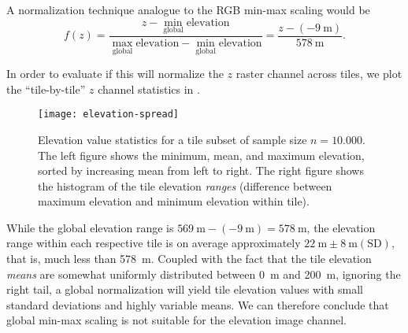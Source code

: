 A normalization technique analogue to the RGB min-max scaling would be
\begin{equation*}
  f(z)
  =
  \frac{
    z - \underset{\mathrm{global}}{\min} \text{elevation}
  }{
    \underset{\mathrm{global}}{\max} \text{elevation} - \underset{\mathrm{global}}{\min} \text{elevation}
  }
  =
  \frac{
    z - (\SI{-9}{\meter})
  }{
    \SI{578}{\meter}
  }.
\end{equation*}

In order to evaluate if this will normalize the $z$ raster channel across tiles, we plot the \enquote{tile-by-tile} $z$ channel statistics in .

\begin{figure}[H]
  \centering
  \texttt{[image: elevation-spread]}
  \caption{
    Elevation value statistics for a tile subset of sample size $n = 10.000$.
    The left figure shows the minimum, mean, and maximum elevation, sorted by increasing mean from left to right.
    The right figure shows the histogram of the tile elevation \textit{ranges} (difference between maximum elevation and minimum elevation within tile).
  }
  \label{fig:elevation-spread}
\end{figure}

While the global elevation range is $\SI{569}{\meter} - (\SI{-9}{\meter}) = \SI{578}{\meter}$, the elevation range within each respective tile is on average approximately $\SI{22}{\meter} \pm \SI{8}{\meter} (\mathrm{SD})$, that is, much less than \SI{578}{\meter}.
Coupled with the fact that the tile elevation \textit{means} are somewhat uniformly distributed between \SI{0}{\meter} and \SI{200}{\meter}, ignoring the right tail, a global normalization will yield tile elevation values with small standard deviations and highly variable means.
We can therefore conclude that global min-max scaling is not suitable for the elevation image channel.
